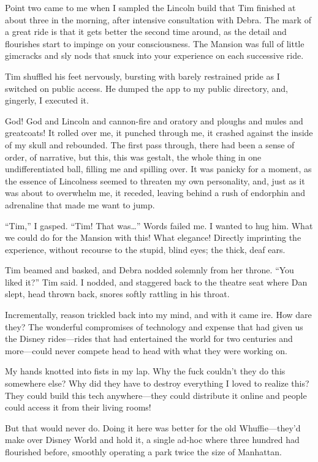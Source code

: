 Point two came to me when I sampled the Lincoln build that Tim
finished at about three in the morning, after intensive
consultation with Debra. The mark of a great ride is that it gets
better the second time around, as the detail and flourishes start
to impinge on your consciousness. The Mansion was full of little
gimcracks and sly nods that snuck into your experience on each
successive ride.

Tim shuffled his feet nervously, bursting with barely restrained
pride as I switched on public access. He dumped the app to my
public directory, and, gingerly, I executed it.

God! God and Lincoln and cannon-fire and oratory and ploughs and
mules and greatcoats! It rolled over me, it punched through me, it
crashed against the inside of my skull and rebounded. The first
pass through, there had been a sense of order, of narrative, but
this, this was gestalt, the whole thing in one undifferentiated
ball, filling me and spilling over. It was panicky for a moment, as
the essence of Lincolness seemed to threaten my own personality,
and, just as it was about to overwhelm me, it receded, leaving
behind a rush of endorphin and adrenaline that made me want to
jump.

“Tim,” I gasped. “Tim! That was…” Words failed me. I wanted to hug
him. What we could do for the Mansion with this! What elegance!
Directly imprinting the experience, without recourse to the stupid,
blind eyes; the thick, deaf ears.

Tim beamed and basked, and Debra nodded solemnly from her throne.
“You liked it?” Tim said. I nodded, and staggered back to the
theatre seat where Dan slept, head thrown back, snores softly
rattling in his throat.

Incrementally, reason trickled back into my mind, and with it came
ire. How dare they? The wonderful compromises of technology and
expense that had given us the Disney rides—rides that had
entertained the world for two centuries and more—could never
compete head to head with what they were working on.

My hands knotted into fists in my lap. Why the fuck couldn't they
do this somewhere else? Why did they have to destroy everything I
loved to realize this? They could build this tech anywhere—they
could distribute it online and people could access it from their
living rooms!

But that would never do. Doing it here was better for the old
Whuffie—they'd make over Disney World and hold it, a single ad-hoc
where three hundred had flourished before, smoothly operating a
park twice the size of Manhattan.

